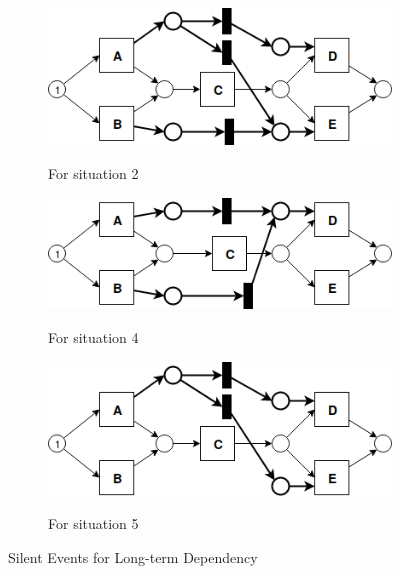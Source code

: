 \begin{figure}[!h]
	\centering
	\begin{subfigure}[a]{\textwidth}
		\includegraphics[width=\textwidth]{figures/algorithm/LT_Seq_01_Silent_01.png}
		\label{fig:seq-2-silent-1}
		\caption{For situation 2}
	\end{subfigure}
	\hfill
	\begin{subfigure}[b]{\textwidth}
		\centering
		\includegraphics[width=\linewidth]{figures/algorithm/LT_Seq_01_Silent_03.png}
		\label{fig:seq-2-silent-2}
		\caption{For situation 4}
	\end{subfigure}
	\hfill
	\begin{subfigure}[c]{\textwidth}
		\centering
		\includegraphics[width=\linewidth]{figures/algorithm/LT_Seq_01_Silent_02.png}
		\label{fig:seq-2-silent-3}
		\caption{For situation 5}
	\end{subfigure}
	\label{fig:seq-2-silent-cases}
	\caption{Silent Events for Long-term Dependency}
\end{figure} 

